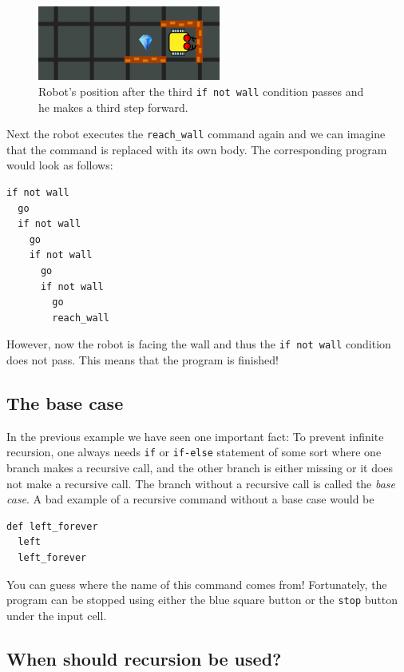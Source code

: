 \documentclass[article,A4,12pt]{llncs}
\begin{document}
{{{{\begin{figure}[!ht]
\begin{center}
\includegraphics[width=6cm]{img/rec-4.png}
\end{center}
\vspace{-4mm}
\caption{Robot's position after the third {\tt if not wall} condition passes and he makes a third step forward.}
\label{fig:rec4}
\end{figure}
\noindent
Next the robot executes the {\tt reach\_wall} command again and we can imagine that the command 
is replaced with its own body. The corresponding program would look as follows:

\begin{verbatim}
if not wall
  go
  if not wall
    go
    if not wall
      go
      if not wall
        go
        reach_wall
\end{verbatim}
\noindent
However, now the robot is facing the wall and thus the {\tt if not wall} condition does not pass.  
This means that the program is finished!

\subsection{The base case}

In the previous example we have seen one important fact: To prevent infinite recursion, one always needs {\tt if} or {\tt if-else} 
statement of some sort where one branch makes a recursive call, and the other branch is either 
missing or it does not make a recursive call. The branch without a recursive 
call is called the {\em base case}. A bad example of a recursive command without a base case would be 

\begin{verbatim}
def left_forever
  left
  left_forever
\end{verbatim}
\noindent
You can guess where the name of this command comes from! Fortunately, the program can be stopped using 
either the blue square button or the {\tt stop} button under the input cell.

\subsection{When should recursion be used?}

}}}}
\end{document}
